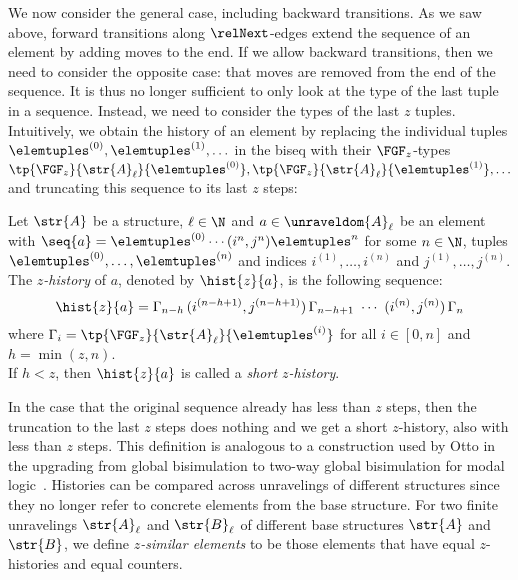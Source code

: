 We now consider the general case, including backward transitions.
As we saw above, forward transitions along $\relNext$-edges extend the sequence of an element by adding moves to the end.
If we allow backward transitions, then we need to consider the opposite case: that moves are removed from the end of the sequence.
It is thus no longer sufficient to only look at the type of the last tuple in a sequence.
Instead, we need to consider the types of the last $z$ tuples.
Intuitively, we obtain the history of an element by replacing the individual tuples $\elemtuples^{(0)}, \elemtuples^{(1)}, \ldots$ in the biseq with their $\FGF_{z}$-types $\tp{\FGF_{z}}{\str{A}_{\ell}}{\elemtuples^{(0)}}, \tp{\FGF_{z}}{\str{A}_{\ell}}{\elemtuples^{(1)}}, \ldots$ and truncating this sequence to its last $z$ steps:
\begin{definition}[$z$-history]
  Let $\str{A}$ be a structure, $\ell \in \N$ and $a \in \unraveldom{A}_{\ell}$ be an element with $\seq{a} = \elemtuples^{(0)} \cdots (i^{n}, j^{n})\elemtuples^{n}$ for some $n \in \N$, tuples $\elemtuples^{(0)}, \ldots, \elemtuples^{(n)}$ and indices $i^{(1)}, \ldots, i^{(n)}$ and $j^{(1)}, \ldots, j^{(n)}$.\\
  The \emph{$z$-history} of $a$, denoted by $\hist{z}{a}$, is the following sequence:
  \begin{equation*}
    \hist{z}{a} =
      \Gamma_{n-h}
      \,
      (i^{(n-h+1)}, j^{(n-h+1)})
      \,
      \Gamma_{n-h+1}
      \
      \cdots
      \
      (i^{(n)}, j^{(n)})
      \,
      \Gamma_{n}
  \end{equation*}
  where $\Gamma_{i} = \tp{\FGF_{z}}{\str{A}_{\ell}}{\elemtuples^{(i)}}$ for all $i \in [0,n]$ and $h = \min(z, n)$. \\[0.5ex]
  If $h < z$, then $\hist{z}{a}$ is called a \emph{short $z$-history}.
\end{definition}
In the case that the original sequence already has less than $z$ steps, then the truncation to the last $z$ steps does nothing and we get a short $z$-history, also with less than $z$ steps.
This definition is analogous to a construction used by Otto in the upgrading from global bisimulation to two-way global bisimulation for modal logic~\cite[Def. 39]{Otto04}.
Histories can be compared across unravelings of different structures since they no longer refer to concrete elements from the base structure.
For two finite unravelings $\str{A}_{\ell}$ and $\str{B}_{\ell}$ of different base structures $\str{A}$ and $\str{B}$, we define \emph{$z$-similar elements} to be those elements that have equal $z$-histories and equal counters.
